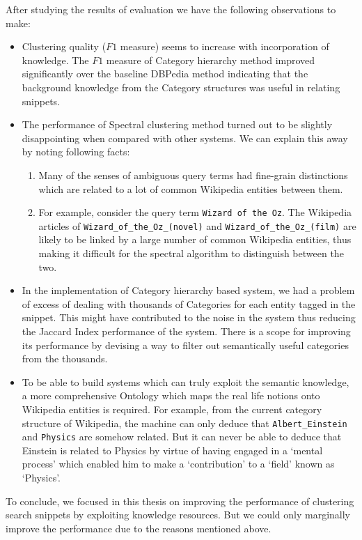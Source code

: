 \documentclass[a4paper,12pt]{report}
\begin{document}
After studying the results of evaluation we have the following
observations to make:

\begin{itemize}
  \item Clustering quality ($F1$ measure) seems to increase with
    incorporation of knowledge. The $F1$ measure of Category hierarchy
    method improved significantly over the baseline DBPedia method
    indicating that the background knowledge from the Category
    structures was useful in relating snippets.

  \item The performance of Spectral clustering method turned out to be
    slightly disappointing when compared with other systems. We can
    explain this away by noting following facts:
    \begin{enumerate}
      \item Many of the senses of ambiguous query terms had fine-grain
        distinctions which are related to a lot of common Wikipedia
        entities between them. 
      \item For example, consider the query term
        \verb|Wizard of the Oz|. The Wikipedia articles of
        \verb|Wizard_of_the_Oz_(novel)| and
        \verb|Wizard_of_the_Oz_(film)| are likely to be linked by a
        large number of common Wikipedia entities, thus making it
        difficult for the spectral algorithm to distinguish between
        the two.
    \end{enumerate}
  \item In the implementation of Category hierarchy based system, we
    had a problem of excess of dealing with thousands of Categories
    for each entity tagged in the snippet. This might have contributed
    to the noise in the system thus reducing the Jaccard Index
    performance of the system. There is a scope for improving its
    performance by devising a way to filter out semantically useful
    categories from the thousands.
  \item To be able to build systems which can truly exploit the
    semantic knowledge, a more comprehensive Ontology which maps the
    real life notions onto Wikipedia entities is required. For
    example, from the current category structure of Wikipedia, the
    machine can only deduce that \verb|Albert_Einstein| and
    \verb|Physics| are somehow related. But it can never be able to
    deduce that Einstein is related to Physics by virtue of having
    engaged in a `mental process' which enabled him to make a
    `contribution' to a `field' known as `Physics'. 
\end{itemize}

To conclude, we focused in this thesis on improving the performance of
clustering search snippets by exploiting knowledge resources. But we
could only marginally improve the performance due to the reasons
mentioned above.

 
 
\end{document}
